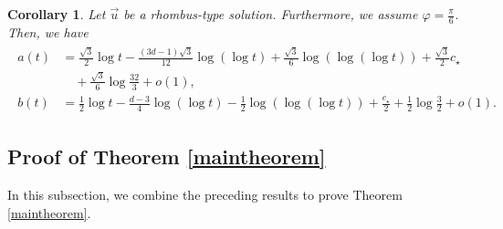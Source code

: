 \documentclass[reqno]{amsart}
\theoremstyle{plain}
\newtheorem{corollary}[theorem]{Corollary}
\theoremstyle{definition}
\numberwithin{equation}{section}
\begin{document}
\begin{corollary}\label{abescoro}
Let $\vec{u}$ be a rhombus-type solution. Furthermore, we assume $\varphi=\frac{\pi}{6}$. Then, we have
\begin{align}\label{abessharpgyaku}
\begin{aligned}
a(t)&=\frac{\sqrt{3}}{2}\log{t}-\frac{(3d-1)\sqrt{3}}{12}\log{(\log{t})}+\frac{\sqrt{3}}{6}\log{(\log{(\log{t})})}+\frac{\sqrt{3}}{2}c_{\star}
\\
&\quad+\frac{\sqrt{3}}{6}\log{\frac{32}{3}}+o(1),
\\
b(t)&=\frac{1}{2}\log{t}-\frac{d-3}{4}\log{(\log{t})}-\frac{1}{2}\log{(\log{(\log{t})})}+\frac{c_{\star}}{2}+\frac{1}{2}\log{\frac{3}{2}}+o(1).
\end{aligned}
\end{align}

\end{corollary}




\subsection{Proof of Theorem \ref{maintheorem}}


In this subsection, we combine the preceding results to prove Theorem \ref{maintheorem}.
\end{document}
